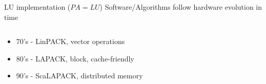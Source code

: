 \begin{frame}{LU implementation ($PA=LU$)}
Software/Algorithms follow hardware evolution in time
  \begin{columns}[c]
    \begin{column}{0.60\textwidth}
      \begin{itemize}
      \item<1-> 70's - LinPACK, vector operations
      \item<2-> 80's - LAPACK, block, cache-friendly
      \item<3-> 90's - ScaLAPACK, distributed memory
      \end{itemize}
    \end{column}
    \begin{column}{0.35\textwidth}

\end{column}
\end{columns}
\end{frame}

